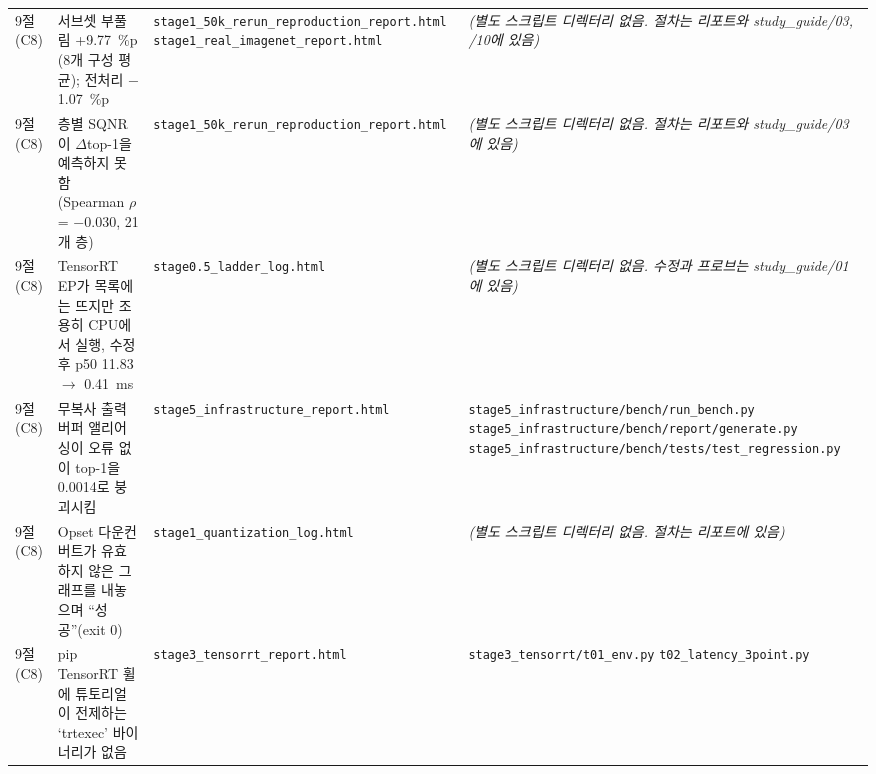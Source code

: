 \documentclass[11pt]{article}
\begin{document}
\begin{longtable}{L{1.2cm} L{3.9cm} L{4.3cm} L{5.0cm}}
\addlinespace[2pt]
9절 (C8) & 서브셋 부풀림 +9.77~\%p (8개 구성 평균); 전처리 $-$1.07~\%p & \texttt{stage1\_\allowbreak 50k\_\allowbreak rerun\_\allowbreak reproduction\_\allowbreak report.html} \newline \texttt{stage1\_\allowbreak real\_\allowbreak imagenet\_\allowbreak report.html} & \emph{(별도 스크립트 디렉터리 없음. 절차는 리포트와 study\_guide/03, /10에 있음)} \\
\addlinespace[2pt]
9절 (C8) & 층별 SQNR이 $\Delta$top-1을 예측하지 못함 (Spearman $\rho$ = $-$0.030, 21개 층) & \texttt{stage1\_\allowbreak 50k\_\allowbreak rerun\_\allowbreak reproduction\_\allowbreak report.html} & \emph{(별도 스크립트 디렉터리 없음. 절차는 리포트와 study\_guide/03에 있음)} \\
\addlinespace[2pt]
9절 (C8) & TensorRT EP가 목록에는 뜨지만 조용히 CPU에서 실행, 수정 후 p50 11.83 $\to$ 0.41~ms & \texttt{stage0.5\_\allowbreak ladder\_\allowbreak log.html} & \emph{(별도 스크립트 디렉터리 없음. 수정과 프로브는 study\_guide/01에 있음)} \\
\addlinespace[2pt]
9절 (C8) & 무복사 출력 버퍼 앨리어싱이 오류 없이 top-1을 0.0014로 붕괴시킴 & \texttt{stage5\_\allowbreak infrastructure\_\allowbreak report.html} & \texttt{stage5\_\allowbreak infrastructure/\allowbreak bench/\allowbreak run\_\allowbreak bench.py} \newline \texttt{stage5\_\allowbreak infrastructure/\allowbreak bench/\allowbreak report/\allowbreak generate.py} \newline \texttt{stage5\_\allowbreak infrastructure/\allowbreak bench/\allowbreak tests/\allowbreak test\_\allowbreak regression.py} \\
\addlinespace[2pt]
9절 (C8) & Opset 다운컨버트가 유효하지 않은 그래프를 내놓으며 ``성공''(exit 0) & \texttt{stage1\_\allowbreak quantization\_\allowbreak log.html} & \emph{(별도 스크립트 디렉터리 없음. 절차는 리포트에 있음)} \\
\addlinespace[2pt]
9절 (C8) & pip TensorRT 휠에 튜토리얼이 전제하는 `trtexec' 바이너리가 없음 & \texttt{stage3\_\allowbreak tensorrt\_\allowbreak report.html} & \texttt{stage3\_\allowbreak tensorrt/\allowbreak t01\_\allowbreak env.py} \newline \texttt{t02\_\allowbreak latency\_\allowbreak 3point.py} \\
\end{longtable}
\endgroup
\end{document}
